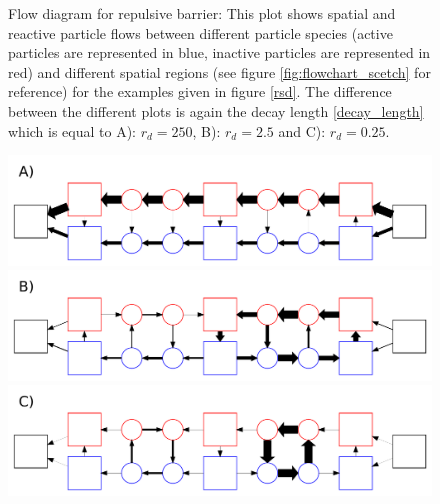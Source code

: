 \begin{minipage}[t]{.372 \textwidth}
    \vspace{0.5 cm}
    \begin{figure}[H]
        \caption{Flow diagram for repulsive barrier: This plot shows spatial and reactive particle flows between different particle species (active particles are represented in blue, inactive particles are represented in red) and different spatial regions (see figure \ref{fig:flowchart_scetch} for reference) for the examples given in figure \ref{rsd}. The difference between the different plots is again the decay length \eqref{decay_length} which is equal to \newline A): $r_d=250$, B): $r_d=2.5$ and \newline C): $r_d = 0.25$.
    \label{fig:flow_repulsive}}
    \end{figure}
\end{minipage}\hspace{0.02 \textwidth}\begin{minipage}[t]{.608 \textwidth}
\vspace{0.6 cm} 
    \begin{figure}[H]
        \includegraphics[width = 1 \textwidth]{plots/rep_flowchart0.pdf}\vspace{0.2 cm}  \\
        \includegraphics[width = 1 \textwidth]{plots/rep_flowchart1.pdf}\vspace{0.2 cm}  \\
        \includegraphics[width = 1 \textwidth]{plots/rep_flowchart2.pdf}\vspace{0.2 cm}  \\
    \end{figure}
\end{minipage}
